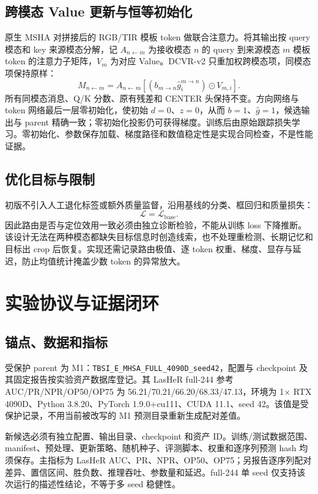 \documentclass[journal]{IEEEtran}
\begin{document}
\subsection{跨模态 Value 更新与恒等初始化}
原生 MSHA 对拼接后的 RGB/TIR 模板 token 做联合注意力。将其输出按 query 模态和 key 来源模态分解，记 $A_{n\leftarrow m}$ 为接收模态 $n$ 的 query 到来源模态 $m$ 模板 token 的注意力子矩阵，$V_m$ 为对应 Value。DCVR-v2 只重加权跨模态项，同模态项保持原样：
\begin{equation}
 M_{n\leftarrow m}=A_{n\leftarrow m}
 \left[(b_{m\rightarrow n}\hat g_i^{m\rightarrow n})\odot V_{m,i}\right].
\end{equation}
所有同模态消息、Q/K 分数、原有残差和 CENTER 头保持不变。方向网络与 token 网络最后一层零初始化，使初始 $d=0$、$z=0$，从而 $b=1$、$\hat g=1$，候选输出与 parent 精确一致；零初始化投影仍可获得梯度。训练后由原始跟踪损失学习。零初始化、参数保存加载、梯度路径和数值稳定性是实现合同检查，不是性能证据。

\subsection{优化目标与限制}
初版不引入人工退化标签或额外质量监督，沿用基线的分类、框回归和质量损失：
\begin{equation}
 \mathcal{L}=\mathcal{L}_{\mathrm{base}}.
\end{equation}
因此路由是否与定位效用一致必须由独立诊断检验，不能从训练 loss 下降推断。该设计无法在两种模态都缺失目标信息时创造线索，也不处理重检测、长期记忆和目标出 crop 后恢复。实现还需记录路由极值、逐 token 权重、梯度、显存与延迟，防止均值统计掩盖少数 token 的异常放大。

\section{实验协议与证据闭环}
\subsection{锚点、数据和指标}
受保护 parent 为 M1：\texttt{TBSI\_E\_MHSA\_FULL\_4090D\_seed42}，配置与 checkpoint 及其固定报告按实验资产数据库登记。其 LasHeR full-244 参考 AUC/PR/NPR/OP50/OP75 为 56.21/70.21/66.20/68.33/47.13，环境为 1$\times$ RTX 4090D、Python 3.8.20、PyTorch 1.9.0+cu111、CUDA 11.1、seed 42。该值是受保护记录，不用当前被改写的 M1 预测目录重新生成配对差值。

新候选必须有独立配置、输出目录、checkpoint 和资产 ID。训练/测试数据范围、manifest、预处理、更新策略、随机种子、评测脚本、权重和逐序列预测 hash 均须保存。主指标为 LasHeR AUC、PR、NPR、OP50、OP75；另报告逐序列配对差异、置信区间、胜负数、推理吞吐、参数量和延迟。full-244 单 seed 仅支持该次运行的描述性结论，不等于多 seed 稳健性。
\end{document}
